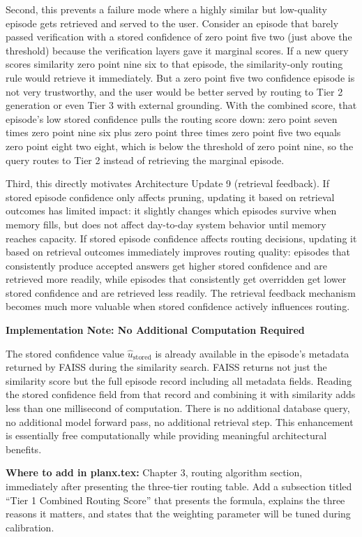 \documentclass[11pt,a4paper]{article}
\newcommand{\ustored}{\hat{u}_{\text{stored}}}
\begin{document}
{Second, this prevents a failure mode where a highly similar but low-quality episode gets retrieved and served to the user. Consider an episode that barely passed verification with a stored confidence of zero point five two (just above the threshold) because the verification layers gave it marginal scores. If a new query scores similarity zero point nine six to that episode, the similarity-only routing rule would retrieve it immediately. But a zero point five two confidence episode is not very trustworthy, and the user would be better served by routing to Tier 2 generation or even Tier 3 with external grounding. With the combined score, that episode's low stored confidence pulls the routing score down: zero point seven times zero point nine six plus zero point three times zero point five two equals zero point eight two eight, which is below the threshold of zero point nine, so the query routes to Tier 2 instead of retrieving the marginal episode.

Third, this directly motivates Architecture Update 9 (retrieval feedback). If stored episode confidence only affects pruning, updating it based on retrieval outcomes has limited impact: it slightly changes which episodes survive when memory fills, but does not affect day-to-day system behavior until memory reaches capacity. If stored episode confidence affects routing decisions, updating it based on retrieval outcomes immediately improves routing quality: episodes that consistently produce accepted answers get higher stored confidence and are retrieved more readily, while episodes that consistently get overridden get lower stored confidence and are retrieved less readily. The retrieval feedback mechanism becomes much more valuable when stored confidence actively influences routing.

\textbf{Implementation Note: No Additional Computation Required}

The stored confidence value $\ustored$ is already available in the episode's metadata returned by FAISS during the similarity search. FAISS returns not just the similarity score but the full episode record including all metadata fields. Reading the stored confidence field from that record and combining it with similarity adds less than one millisecond of computation. There is no additional database query, no additional model forward pass, no additional retrieval step. This enhancement is essentially free computationally while providing meaningful architectural benefits.

\textbf{Where to add in planx.tex:} Chapter 3, routing algorithm section, immediately after presenting the three-tier routing table. Add a subsection titled ``Tier 1 Combined Routing Score'' that presents the formula, explains the three reasons it matters, and states that the weighting parameter will be tuned during calibration.
}
\end{document}
